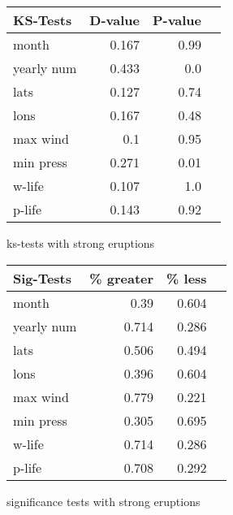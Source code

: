 \begin{figure}[!tbp]
\centering
\begin{minipage}[b]{0.45\textwidth}
\begin{tabular}{lrrr}
\toprule
             KS-Tests & D-value & P-value \\
\midrule

month & 0.167 & 0.99 \\
yearly num & 0.433 & 0.0 \\
lats & 0.127 & 0.74 \\
lons & 0.167 & 0.48 \\
max wind & 0.1 & 0.95 \\
min press & 0.271 & 0.01 \\
w-life & 0.107 & 1.0 \\
p-life & 0.143 & 0.92 \\

\bottomrule
\end{tabular}
\caption{ks-tests with strong eruptions}
\label{ks_10}
\end{minipage}
\hfill
\begin{minipage}[b]{0.45\textwidth}
\begin{tabular}{lrrr}
\toprule
             Sig-Tests & \% greater & \% less \\
\midrule

month & 0.39 & 0.604 \\
yearly num & 0.714 & 0.286 \\
lats & 0.506 & 0.494 \\
lons & 0.396 & 0.604 \\
max wind & 0.779 & 0.221 \\
min press & 0.305 & 0.695 \\
w-life & 0.714 & 0.286 \\
p-life & 0.708 & 0.292 \\


\bottomrule
\end{tabular}
\caption{significance tests with strong eruptions}
\label{sig_10}
\end{minipage}
\end{figure}


